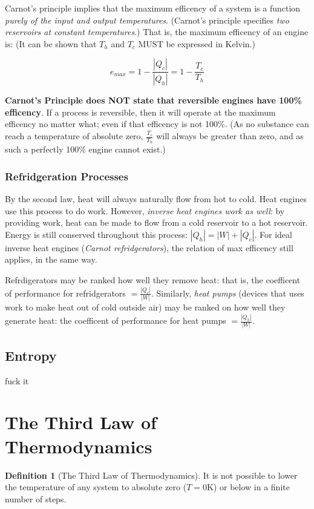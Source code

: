 \documentclass[12pt, a4paper]{article}
\theoremstyle{definition}
\newtheorem{definition}{Definition}
\begin{document}
Carnot's principle implies that the maximum efficency of a system is a function \textit{purely of the input and output temperatures}.
(Carnot's principle specifies \textit{two reservoirs at constant temperatures}.)
That is, the maximum efficency of an engine is: (It can be shown that $T_h$ and $T_c$ MUST be expressed in Kelvin.)

\[e_{max} = 1 - \frac{|Q_c|}{|Q_h|} = 1 - \frac{T_c}{T_h}\]

\textbf{Carnot's Principle does NOT state that reversible engines have 100\% efficency}.
If a process is reversible, then it will operate at the maximum efficency no matter what; even if that efficency is not 100\%.
(As no substance can reach a temperature of absolute zero, $\frac{T_c}{T_h}$ will always be greater than zero, and as such a perfectly 100\% engine cannot exist.)

\subsubsection{Refridgeration Processes}
By the second law, heat will always naturally flow from hot to cold.
Heat engines use this process to do work.
However, \textit{inverse heat engines work as well}: by providing work, heat can be made to flow from a cold reservoir to a hot reservoir.
Energy is still conserved throughout this process: $|Q_h| = |W| + |Q_c|$.
For ideal inverse heat engines (\textit{Carnot refridgerators}), the relation of max efficency still applies, in the same way.

Refrdigerators may be ranked how well they remove heat: that is, the coefficent of performance for refridgerators $= \frac{|Q_c|}{|W|}$.
Similarly, \textit{heat pumps} (devices that uses work to make heat out of cold outside air) may be ranked on how well they generate heat: the coefficent of performance for heat pumps $= \frac{|Q_h|}{|W|}$.

\subsection{Entropy}
fuck it

\section{The Third Law of Thermodynamics}
\begin{definition}[The Third Law of Thermodynamics]
    It is not possible to lower the temperature of any system to absolute zero ($T = 0\textrm{K}$) or below in a finite number of steps.
\end{definition}
\end{document}
